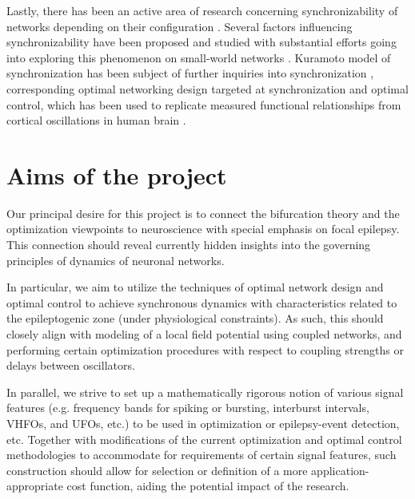 \documentclass[a4paper,11pt]{scrartcl}
\begin{document}
Lastly, there has been an active area of research concerning synchronizability of networks depending on their configuration \cite{Hong2004, Nishikawa2003}. Several factors influencing synchronizability have been proposed and studied with substantial efforts going into exploring this phenomenon on small-world networks \cite{Hong2002, Hong2002-1}. Kuramoto model of synchronization \cite{Kuramoto1984} has been subject of further inquiries into synchronization \cite{Hong2011}, corresponding optimal networking design targeted at synchronization \cite{Fazlyab2017, Nishikawa2006} and optimal control, which has been used to replicate measured functional relationships from cortical oscillations in human brain \cite{Menara2022}.


\section{Aims of the project}\label{sec:aims}

Our principal desire for this project is to connect the bifurcation theory and the optimization viewpoints to neuroscience with special emphasis on focal epilepsy. This connection should reveal currently hidden insights into the governing principles of dynamics of neuronal networks.

In particular, we aim to utilize the techniques of optimal network design \cite{Motter2007} and optimal control \cite{Baggio2021} to achieve synchronous dynamics with characteristics related to the epileptogenic zone (under physiological constraints). As such, this should closely align with modeling of a local field potential using coupled networks, and performing certain optimization procedures with respect to coupling strengths or delays between oscillators. 

In parallel, we strive to set up a mathematically rigorous notion of various signal features (e.g. frequency bands for spiking or bursting, interburst intervals, VHFOs, and UFOs, etc.) \cite{Wedler2022, Srivastava2016} to be used in optimization or epilepsy-event detection, etc. Together with modifications of the current optimization and optimal control methodologies to accommodate for requirements of certain signal features, such construction should allow for selection or definition of a more application-appropriate cost function, aiding the potential impact of the research.
\end{document}

